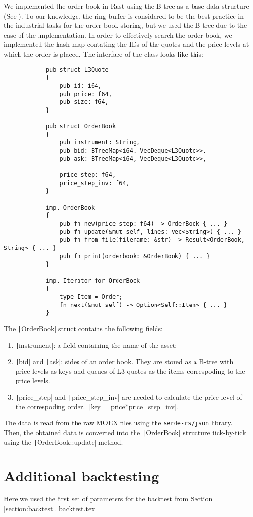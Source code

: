 \begin{appendices}
        We implemented the order book in Rust using the B-tree as a base data structure (See \Cite{Cormen2022}). To our knowledge, 
        the ring buffer is considered to be the best practice in the industrial tasks for the order book storing, but we used 
        the B-tree due to the ease of the implementation.
        In order to effectively search the order book, we implemented the hash map contating the IDs of the quotes and
        the price levels at which the order is placed. The interface of the class looks like this:
        \begin{verbatim}
            pub struct L3Quote
            {
                pub id: i64,
                pub price: f64,
                pub size: f64,
            }

            pub struct OrderBook
            {
                pub instrument: String,
                pub bid: BTreeMap<i64, VecDeque<L3Quote>>,
                pub ask: BTreeMap<i64, VecDeque<L3Quote>>,

                price_step: f64,
                price_step_inv: f64,
            }

            impl OrderBook
            {
                pub fn new(price_step: f64) -> OrderBook { ... }
                pub fn update(&mut self, lines: Vec<String>) { ... }
                pub fn from_file(filename: &str) -> Result<OrderBook, String> { ... }
                pub fn print(orderbook: &OrderBook) { ... }
            }

            impl Iterator for OrderBook 
            {
                type Item = Order; 
                fn next(&mut self) -> Option<Self::Item> { ... }
            }
        \end{verbatim}
        
        The \texttt|OrderBook| struct contains the following fields:
        \begin{enumerate}
            \item \texttt|instrument|: a field containing the name of the asset;
            \item \texttt|bid| and \texttt|ask|: sides of an order book. They are 
                stored as a B-tree with price levels as keys and queues of L3 quotes as the items correspoding
                to the price levels.
            \item \texttt|price_step| and \texttt|price_step_inv| are needed to calculate the 
                price level of the correspoding order. \texttt|key = price*price_step_inv|.
        \end{enumerate}
        The data is read from the raw MOEX files using the \href{github.com/serde-rs/json}{\texttt{serde-rs/json}} library. Then, the obtained data is
        converted into the \texttt|OrderBook| structure tick-by-tick using the \texttt|OrderBook::update| method.

    \section{Additional backtesting}\label{appendix:backtest}
        Here we used the first set of parameters for the backtest from Section \ref{section:backtest}.
        {backtest.tex}
\end{appendices}   %